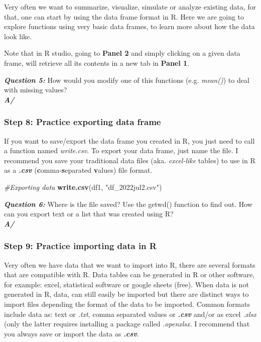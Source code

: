 \documentclass[]{article}
\newenvironment{Shaded}{\begin{snugshade}}{\end{snugshade}}
\newcommand{\CommentTok}[1]{\textcolor[rgb]{0.56,0.35,0.01}{\textit{#1}}}
\newcommand{\KeywordTok}[1]{\textcolor[rgb]{0.13,0.29,0.53}{\textbf{#1}}}
\newcommand{\NormalTok}[1]{#1}
\newcommand{\StringTok}[1]{\textcolor[rgb]{0.31,0.60,0.02}{#1}}
\begin{document}
Very often we want to summarize, visualize, simulate or analyze existing
data, for that, one can start by using the data frame format in R. Here
we are going to explore functions using very basic data frames, to learn
more about how the data look like.

Note that in R studio, going to \textbf{Panel 2} and simply clicking on
a given data frame, will retrieve all its contents in a new tab in
\textbf{Panel 1}.

\textbf{\emph{Question 5:}} How would you modify one of this functions
(e.g. \emph{mean()}) to deal with missing values?\\
\textbf{\emph{A/}}

\hypertarget{step-8-practice-exporting-data-frame}{%
\subsubsection{Step 8: Practice exporting data
frame}\label{step-8-practice-exporting-data-frame}}

If you want to save/export the data frame you created in R, you just
need to call a function named \emph{write.csv}. To export your data
frame, just name the file. I recommend you save your traditional data
files (aka. \emph{excel-like} tables) to use in R as a
\textbf{\emph{.csv}} (\textbf{c}omma-\textbf{s}eparated \textbf{v}alues)
file format.

\begin{Shaded}
\begin{Highlighting}[]
\CommentTok{#Exporting data}
\KeywordTok{write.csv}\NormalTok{(df1, }\StringTok{"df_2022jul2.csv"}\NormalTok{) }
\end{Highlighting}
\end{Shaded}

\textbf{\emph{Question 6:}} Where is the file saved? Use the getwd()
function to find out. How can you export text or a list that was created
using R?\\
\textbf{\emph{A/}}

\hypertarget{step-9-practice-importing-data-in-r}{%
\subsubsection{Step 9: Practice importing data in
R}\label{step-9-practice-importing-data-in-r}}

Very often we have data that we want to import into R, there are several
formats that are compatible with R. Data tables can be generated in R or
other software, for example: excel, statistical software or google
sheets (free). When data is not generated in R, data, can still easily
be imported but there are distinct ways to import files depending the
format of the data to be imported. Common formats include data as: text
or \emph{.txt}, comma separated values or \textbf{\emph{.csv}} and/or as
excel \emph{.xlsx} (only the latter requires installing a package called
\emph{.openxlsx}. I recommend that you always save or import the data as
\textbf{\emph{.csv}}.
\end{document}
